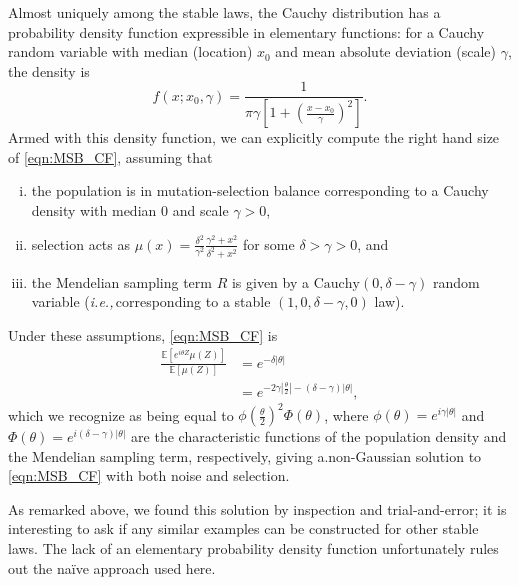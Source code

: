 \documentclass{article}
\newcommand{\ie}{\textit{i.e.,}\,}
\newcommand{\1}{\mathbbm{1}}
\theoremstyle{remark}
\theoremstyle{definition}
\begin{document}
Almost uniquely among the stable laws, the Cauchy distribution has a probability density function expressible in elementary functions: 
for a Cauchy random variable with median (location) $x_{0}$ and mean absolute deviation (scale) $\gamma$, the density is 
\begin{equation}\label{eq:Cpdf}
	f(x;x_{0},\gamma) = \frac{1}{\pi\gamma\left[1+\left(\frac{x-x_{0}}{\gamma}\right)^{2}\right]}.  
\end{equation}	
Armed with this density function, we can explicitly compute the right hand size of \eqref{eqn:MSB_CF}, assuming that 
\begin{enumerate}[(i)]
\item the population is in mutation-selection balance corresponding to a Cauchy density with median 0 and scale $\gamma > 0$,
\item selection acts as $\mu(x) = \frac{\delta^{2}}{\gamma^{2}} \frac{\gamma^{2} + x^{2}}{\delta^{2} + x^{2}}$ for some $\delta > \gamma > 0$, and
\item the Mendelian sampling term $R$ is given by a $\text{Cauchy}(0,\delta-\gamma)$ random variable (\ie corresponding to a stable $(1,0,\delta-\gamma,0)$ law).
\end{enumerate}

Under these assumptions, \eqref{eqn:MSB_CF} is
\begin{align*}
	\frac{\mathbb{E}\left[e^{i \theta Z}\mu(Z)\right]}{\mathbb{E}[\mu(Z)]} 
	&= e^{-\delta |\theta|}\\
	&= e^{-2\gamma \left|\frac{\theta}{2}\right|-(\delta-\gamma)|\theta|},
\end{align*} 
which we recognize as being equal to $\phi\left(\frac{\theta}{2}\right)^{2} \Phi(\theta)$, where $\phi(\theta) = e^{i\gamma|\theta|}$ and $\Phi(\theta) = e^{i(\delta - \gamma)|\theta|}$ are the characteristic functions of the population density and the Mendelian sampling term, respectively,
giving a.non-Gaussian solution to \eqref{eqn:MSB_CF} with both noise and selection.

As remarked above, we found this solution by inspection and trial-and-error; it is interesting to ask if any similar examples can be constructed for other stable laws.  The lack of an elementary probability density function unfortunately rules out the na\"ive approach used here. 

\end{document}
